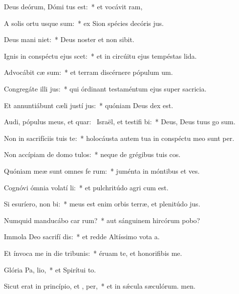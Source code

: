 \item Deus deórum, Dómi tus est:~* et vocávit ram,
\item A solis ortu usque  sum:~* ex Sion spécies decóris jus.
\item Deus mani niet:~* Deus noster et non sibit.
\item Ignis in conspéctu ejus scet:~* et in circúitu ejus tempéstas lida.
\item Advocábit cæ sum:~* et terram discérnere pópulum um.
\item Congregáte illi  jus:~* qui órdinant testaméntum ejus super sacricia.
\item Et annuntiábunt cæli justí jus:~* quóniam Deus dex est.
\item Audi, pópulus meus, et quar:~\pscross{} Israël, et testifi bi:~* Deus, Deus tuus go sum.
\item Non in sacrifíciis tuis  te:~* holocáusta autem tua in conspéctu meo sunt per.
\item Non accípiam de domo  tulos:~* neque de grégibus tuis cos.
\item Quóniam meæ sunt omnes fe rum:~* juménta in móntibus et ves.
\item Cognóvi ómnia volatí li:~* et pulchritúdo agri cum est.
\item Si esuríero, non  bi:~* meus est enim orbis terræ, et plenitúdo jus.
\item Numquid manducábo car rum?~* aut sánguinem hircórum pobo?
\item Immola Deo sacrifí dis:~* et redde Altíssimo vota a.
\item Et ínvoca me in die tribunis:~* éruam te, et honorifibis me.
\item Glória Pa,  lio,~* et Spirítui to.
\item Sicut erat in princípio, et ,  per,~* et in sǽcula sæculórum. men.
